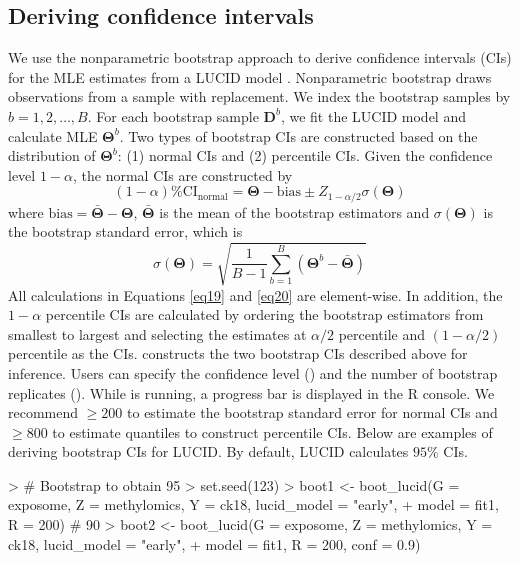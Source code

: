 \subsection{Deriving confidence intervals} \label{sec3.4}
We use the nonparametric bootstrap approach to derive confidence intervals (CIs) for the MLE estimates from a LUCID model \citep{davison1997bootstrap}. Nonparametric bootstrap draws observations from a sample with replacement. We index the bootstrap samples by $b = 1, 2, \ldots, B$. For each bootstrap sample $\bm{D}^b$, we fit the LUCID model and calculate MLE $\bm{\Theta}^b$. Two types of bootstrap CIs are constructed based on the distribution of $\bm{\Theta}^b$: (1) normal CIs and (2) percentile CIs.
Given the confidence level $1 - \alpha$, the normal CIs are constructed by
\begin{equation}
    (1 - \alpha)\% \text{CI}_{\text{normal}} = \bm{\Theta} - \text{bias} \pm Z_{1 - \alpha/2}\sigma(\bm \Theta)
    \label{eq19}
\end{equation}
where $\text{bias} = \bar{\bm \Theta} - \bm{\Theta}$, $\bar{\bm \Theta}$ is the mean of the bootstrap estimators and $\sigma(\bm \Theta)$ is the bootstrap standard error, which is
\begin{equation}
    \sigma(\bm \Theta) = \sqrt{\frac{1}{B - 1}\sum_{b=1}^B\left(\bm{\Theta}^b - \bar{\bm \Theta}\right)}
    \label{eq20}
\end{equation}
All calculations in Equations \ref{eq19} and \ref{eq20} are element-wise.
In addition, the $1 - \alpha$ percentile CIs are calculated by ordering the bootstrap estimators from smallest to largest and selecting the estimates at $\alpha/2$ percentile and $(1 - \alpha/2)$ percentile as the CIs.
 constructs the two bootstrap CIs described above for inference. Users can specify the confidence level () and the number of bootstrap replicates (). While  is running, a progress bar is displayed in the R console. We recommend  $\geq 200$ to estimate the bootstrap standard error for normal CIs and  $\geq 800$ to estimate quantiles to construct percentile CIs. Below are examples of deriving bootstrap CIs for LUCID. By default, LUCID calculates $95\%$ CIs.
\begin{example}
> # Bootstrap to obtain 95%
> set.seed(123)
> boot1 <- boot_lucid(G = exposome, Z = methylomics, Y = ck18, lucid_model = "early",
+                     model = fit1, R = 200)
# 90%
> boot2 <- boot_lucid(G = exposome, Z = methylomics, Y = ck18, lucid_model = "early",
+                     model = fit1, R = 200, conf = 0.9)
\end{example}
